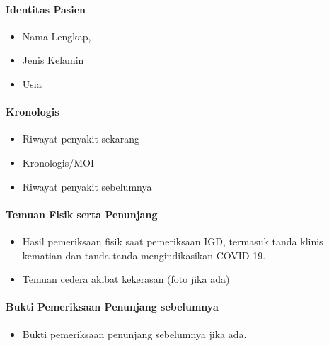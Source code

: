 \documentclass[
]{book}
\providecommand{\tightlist}{%
  \setlength{\itemsep}{0pt}\setlength{\parskip}{0pt}}
\begin{document}
\hypertarget{identitas-pasien-1}{%
\paragraph{Identitas Pasien}\label{identitas-pasien-1}}

\begin{itemize}
\item
  Nama Lengkap,
\item
  Jenis Kelamin
\item
  Usia
\end{itemize}

\hypertarget{kronologis}{%
\paragraph{Kronologis}\label{kronologis}}

\begin{itemize}
\item
  Riwayat penyakit sekarang
\item
  Kronologis/MOI
\item
  Riwayat penyakit sebelumnya
\end{itemize}

\hypertarget{temuan-fisik-serta-penunjang}{%
\paragraph{Temuan Fisik serta Penunjang}\label{temuan-fisik-serta-penunjang}}

\begin{itemize}
\item
  Hasil pemeriksaan fisik saat pemeriksaan IGD, termasuk tanda klinis kematian dan tanda tanda mengindikasikan COVID-19.
\item
  Temuan cedera akibat kekerasan (foto jika ada)
\end{itemize}

\hypertarget{bukti-pemeriksaan-penunjang-sebelumnya-1}{%
\paragraph{Bukti Pemeriksaan Penunjang sebelumnya}\label{bukti-pemeriksaan-penunjang-sebelumnya-1}}

\begin{itemize}
\tightlist
\item
  Bukti pemeriksaan penunjang sebelumnya jika ada.
\end{itemize}
\end{document}
